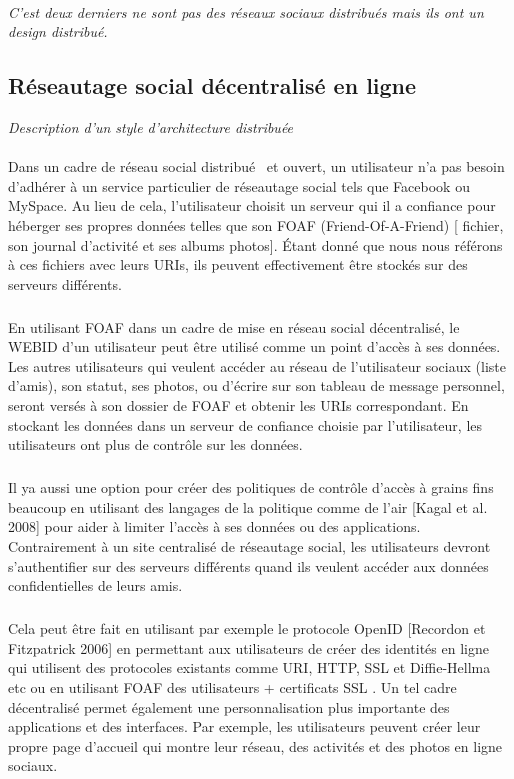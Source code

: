 \paragraph{}
\textit{C'est deux derniers ne sont pas des réseaux sociaux distribués mais ils ont un design distribué. }
\newpage
\subsection{Réseautage social décentralisé en ligne}
\textit{Description d'un style d'architecture distribuée}
\paragraph{}
Dans un cadre de réseau social distribué~\cite{eti} et ouvert, un utilisateur n'a pas besoin d'adhérer à un service particulier de réseautage social tels que Facebook ou MySpace. Au lieu de cela, l'utilisateur choisit un serveur qui il a confiance pour héberger ses propres données telles que son FOAF (Friend-Of-A-Friend) [ fichier, son journal d'activité et ses albums photos]. Étant donné que nous nous référons à ces fichiers avec leurs URIs, ils peuvent effectivement être stockés sur des serveurs différents.
\subparagraph{}
En utilisant FOAF dans un cadre de mise en réseau social décentralisé, le WEBID d'un utilisateur peut être utilisé comme un point d'accès à ses données. Les autres utilisateurs qui veulent accéder au réseau de l'utilisateur sociaux (liste d'amis), son statut, ses photos, ou d'écrire sur son tableau de message personnel, seront versés à son dossier de FOAF et obtenir les URIs correspondant. En stockant les données dans un serveur de confiance choisie par l'utilisateur, les utilisateurs ont plus de contrôle sur les données. 
\subparagraph{}
Il ya aussi une option pour créer des politiques de contrôle d'accès à grains fins beaucoup en utilisant des langages de la politique comme de l'air [Kagal et al. 2008] pour aider à limiter l'accès à ses données ou des applications. Contrairement à un site centralisé de réseautage social, les utilisateurs devront s'authentifier sur des serveurs différents quand ils veulent accéder aux données confidentielles de leurs amis. 
\subparagraph{}
Cela peut être fait en utilisant par exemple le protocole OpenID [Recordon et Fitzpatrick 2006] en permettant aux utilisateurs de créer des identités en ligne qui utilisent des protocoles existants comme URI, HTTP, SSL et Diffie-Hellma etc ou en utilisant FOAF des utilisateurs + certificats SSL . Un tel cadre décentralisé permet également une personnalisation plus importante des applications et des interfaces. Par exemple, les utilisateurs peuvent créer leur propre page d'accueil qui montre leur réseau, des activités et des photos en ligne sociaux.

